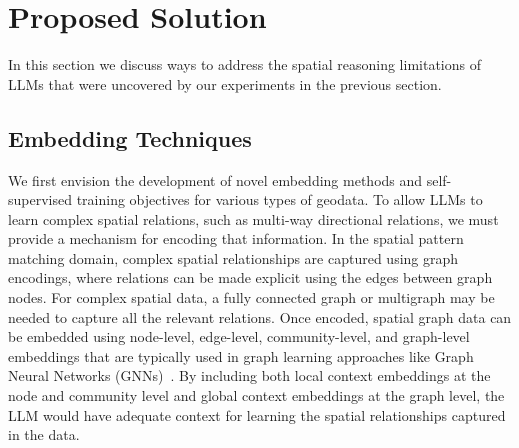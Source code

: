 \section{Proposed Solution}
\label{section:proposal}

In this section we discuss ways to address the spatial reasoning limitations of LLMs that were uncovered by our experiments in the previous section.


\subsection{Embedding Techniques}
We first envision the development of novel embedding methods and self-supervised training objectives for various types of geodata.
%
%
To allow LLMs to learn complex spatial relations, such as multi-way directional relations, we must provide a mechanism for encoding that information.
In the spatial pattern matching domain, complex spatial relationships are captured using graph encodings, where relations can be made explicit using the edges between graph nodes.
For complex spatial data, a fully connected graph or multigraph may be needed to capture all the relevant relations. 
Once encoded, spatial graph data can be embedded using node-level, edge-level, community-level, and graph-level embeddings that are typically used in graph learning approaches like Graph Neural Networks (GNNs)~\cite{Bai2019,Krlevza2016,Liu2020Neural}.
By including both local context embeddings at the node and community level and global context embeddings at the graph level, the LLM would have adequate context for learning the spatial relationships captured in the data.


